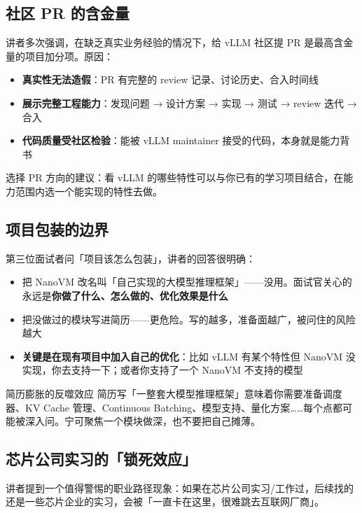 \documentclass[a4paper]{article}
\begin{document}
\subsection{社区 PR 的含金量}

讲者多次强调，在缺乏真实业务经验的情况下，给 vLLM 社区提 PR 是最高含金量的项目加分项。原因：

\begin{itemize}
  \item \textbf{真实性无法造假}：PR 有完整的 review 记录、讨论历史、合入时间线
  \item \textbf{展示完整工程能力}：发现问题 → 设计方案 → 实现 → 测试 → review 迭代 → 合入
  \item \textbf{代码质量受社区检验}：能被 vLLM maintainer 接受的代码，本身就是能力背书
\end{itemize}

选择 PR 方向的建议：看 vLLM 的哪些特性可以与你已有的学习项目结合，在能力范围内选一个能实现的特性去做。

\subsection{项目包装的边界}

第三位面试者问「项目该怎么包装」，讲者的回答很明确：

\begin{itemize}
  \item 把 NanoVM 改名叫「自己实现的大模型推理框架」——没用。面试官关心的永远是\textbf{你做了什么、怎么做的、优化效果是什么}
  \item 把没做过的模块写进简历——更危险。写的越多，准备面越广，被问住的风险越大
  \item \textbf{关键是在现有项目中加入自己的优化}：比如 vLLM 有某个特性但 NanoVM 没实现，你去支持一下；或者你支持了一个 NanoVM 不支持的模型
\end{itemize}

\begin{warningbox}{简历膨胀的反噬效应}
  简历写「一整套大模型推理框架」意味着你需要准备调度器、KV Cache 管理、Continuous Batching、模型支持、量化方案……每个点都可能被深入问。宁可聚焦一个模块做深，也不要把自己摊薄。
\end{warningbox}

\subsection{芯片公司实习的「锁死效应」}

讲者提到一个值得警惕的职业路径现象：如果在芯片公司实习/工作过，后续找的还是一些芯片企业的实习，会被「一直卡在这里，很难跳去互联网厂商」。
\end{document}
